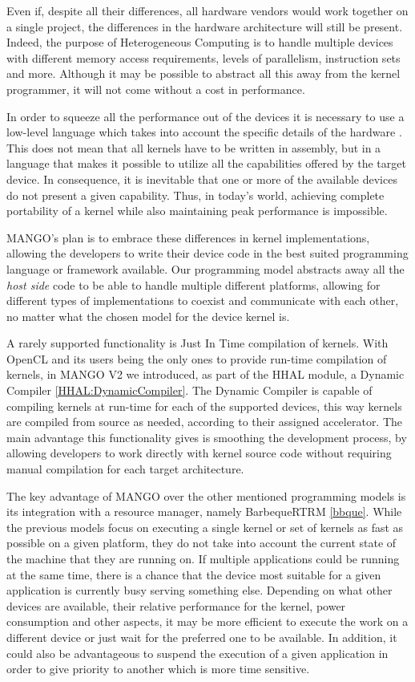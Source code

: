 Even if, despite all their differences, all hardware vendors would work together on a single project, the differences in the hardware architecture will still be present. Indeed, the purpose of Heterogeneous Computing is to handle multiple devices with different memory access requirements, levels of parallelism, instruction sets and more. Although it may be possible to abstract all this away from the kernel programmer, it will not come without a cost in performance.

In order to squeeze all the performance out of the devices it is necessary to use a low-level language which takes into account the specific details of the hardware \cite{cuda_open_source_compiler}. This does not mean that all kernels have to be written in assembly, but in a language that makes it possible to utilize all the capabilities offered by the target device. In consequence, it is inevitable that one or more of the available devices do not present a given capability. Thus, in today's world, achieving complete portability of a kernel while also maintaining peak performance is impossible.

MANGO's plan is to embrace these differences in kernel implementations, allowing the developers to write their device code in the best suited programming language or framework available. Our programming model abstracts away all the \textit{host side} code to be able to handle multiple different platforms, allowing for different types of implementations to coexist and communicate with each other, no matter what the chosen model for the device kernel is.

A rarely supported functionality is Just In Time compilation of kernels. With OpenCL and its users being the only ones to provide run-time compilation of kernels, in MANGO V2 we introduced, as part of the HHAL module, a Dynamic Compiler \ref{HHAL:DynamicCompiler}. The Dynamic Compiler is capable of compiling kernels at run-time for each of the supported devices, this way kernels are compiled from source as needed, according to their assigned accelerator.
The main advantage this functionality gives is smoothing the development process, by allowing developers to work directly with kernel source code without requiring manual compilation for each target architecture.

The key advantage of MANGO over the other mentioned programming models is its integration with a resource manager, namely BarbequeRTRM \ref{bbque}. While the previous models focus on executing a single kernel or set of kernels as fast as possible on a given platform, they do not take into account the current state of the machine that they are running on. If multiple applications could be running at the same time, there is a chance that the device most suitable for a given application is currently busy serving something else. Depending on what other devices are available, their relative performance for the kernel, power consumption and other aspects, it may be more efficient to execute the work on a different device or just wait for the preferred one to be available. In addition, it could also be advantageous to suspend the execution of a given application in order to give priority to another which is more time sensitive.

